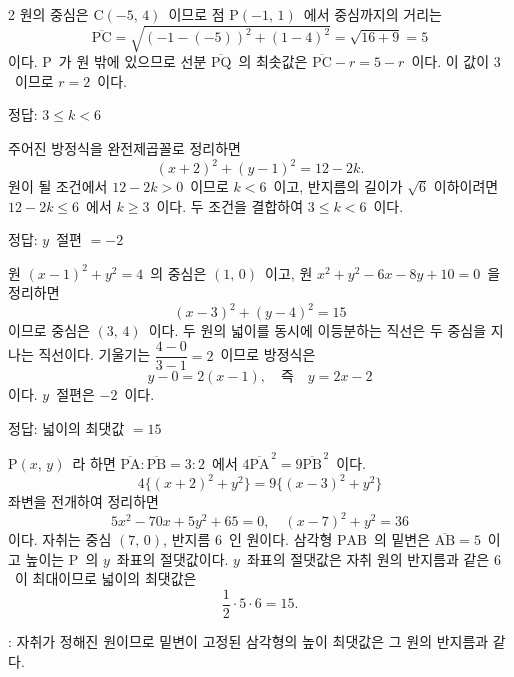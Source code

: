 \documentclass[10pt,fleqn]{article}
\begin{document}
\begin{multicols*}{2}
원의 중심은 $\mathrm{C}(-5,\, 4)$\ 이므로 점 $\mathrm{P}(-1,\, 1)$\ 에서 중심까지의 거리는
\[ \overline{\mathrm{PC}} = \sqrt{(-1-(-5))^2 + (1-4)^2} = \sqrt{16 + 9} = 5 \]
이다. $\mathrm{P}$\ 가 원 밖에 있으므로 선분 $\overline{\mathrm{PQ}}$\ 의 최솟값은 $\overline{\mathrm{PC}} - r = 5 - r$\ 이다. 이 값이 $3$\ 이므로 $r = 2$\ 이다.

\begin{dmanswerbox}
정답: $3 \le k < 6$
\end{dmanswerbox}

주어진 방정식을 완전제곱꼴로 정리하면
\[ (x+2)^2 + (y-1)^2 = 12 - 2k. \]
원이 될 조건에서 $12 - 2k > 0$\ 이므로 $k < 6$\ 이고, 반지름의 길이가 $\sqrt{6}$ 이하이려면 $12 - 2k \le 6$\ 에서 $k \ge 3$\ 이다. 두 조건을 결합하여 $3 \le k < 6$\ 이다.

\begin{dmanswerbox}
정답: $y$\ 절편 $=-2$
\end{dmanswerbox}

원 $(x-1)^2 + y^2 = 4$\ 의 중심은 $(1,\, 0)$\ 이고, 원 $x^2 + y^2 - 6x - 8y + 10 = 0$\ 을 정리하면
\[ (x-3)^2 + (y-4)^2 = 15 \]
이므로 중심은 $(3,\, 4)$\ 이다. 두 원의 넓이를 동시에 이등분하는 직선은 두 중심을 지나는 직선이다. 기울기는 $\dfrac{4-0}{3-1} = 2$\ 이므로 방정식은
\[ y - 0 = 2(x - 1),\quad \text{즉}\quad y = 2x - 2 \]
이다. $y$\ 절편은 $-2$\ 이다.
\begin{dmanswerbox}
정답: 넓이의 최댓값 $=15$
\end{dmanswerbox}

$\mathrm{P}(x,\, y)$\ 라 하면 $\overline{\mathrm{PA}} : \overline{\mathrm{PB}} = 3 : 2$\ 에서 $4\overline{\mathrm{PA}}^{\,2} = 9\overline{\mathrm{PB}}^{\,2}$\ 이다.
\[ 4\{(x+2)^2 + y^2\} = 9\{(x-3)^2 + y^2\} \]
좌변을 전개하여 정리하면
\[ 5x^2 - 70x + 5y^2 + 65 = 0,\quad (x-7)^2 + y^2 = 36 \]
이다. 자취는 중심 $(7,\, 0)$, 반지름 $6$\ 인 원이다. 삼각형 $\mathrm{PAB}$\ 의 밑변은 $\overline{\mathrm{AB}} = 5$\ 이고 높이는 $\mathrm{P}$\ 의 $y$\ 좌표의 절댓값이다. $y$\ 좌표의 절댓값은 자취 원의 반지름과 같은 $6$\ 이 최대이므로 넓이의 최댓값은
\[ \dfrac{1}{2} \cdot 5 \cdot 6 = 15. \]

\begin{dmcriticalpoint}
: 자취가 정해진 원이므로 밑변이 고정된 삼각형의 높이 최댓값은 그 원의 반지름과 같다.
\end{dmcriticalpoint}

\end{multicols*}
\end{document}

